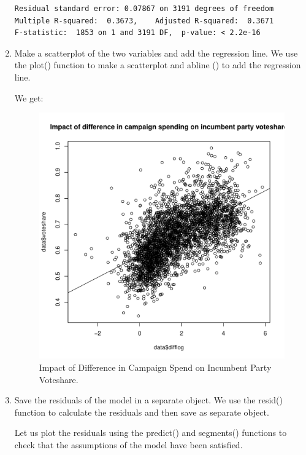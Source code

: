 \documentclass[12pt,letterpaper]{article}
\begin{document}
\begin{enumerate}
\begin{verbatim}
Residual standard error: 0.07867 on 3191 degrees of freedom
Multiple R-squared:  0.3673,	Adjusted R-squared:  0.3671 
F-statistic:  1853 on 1 and 3191 DF,  p-value: < 2.2e-16
\end{verbatim}
		\item Make a scatterplot of the two variables and add the regression line. 	\vspace{7cm}
\noindent We use the plot() function to make a scatterplot and abline () to add the regression line.\\
\vspace{.5cm}
  
\vspace{.5cm}   
\noindent We get:\\
\begin{figure}[h!]\centering
	\caption{\footnotesize Impact of Difference in Campaign Spend on Incumbent Party Voteshare.}
	\label{fig:plot_1}
	\includegraphics[width=.5\textwidth]{plot1_difflog_voteshare.pdf}
\end{figure}
		\item Save the residuals of the model in a separate object.	\vspace{7cm}
\noindent We use the resid() function to calculate the residuals and then save as separate object.\\
\vspace{.5cm}
  
\vspace{.5cm}   
\noindent Let us plot the residuals using the predict() and segments() functions to check that the assumptions of the model have been satisfied.\\
\vspace{.5cm}
  
\vspace{.5cm}   

\end{enumerate}
\end{document}
